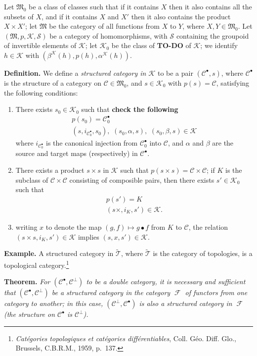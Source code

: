 \documentclass{article}
\newenvironment{itenv}[1]
  {\phantomsection\par\medskip\noindent\textbf{#1.}\itshape}
  {\par\medskip}
\newenvironment{rmenv}[1]
  {\phantomsection\par\medskip\noindent\textbf{#1.}\rmfamily}
  {\par\medskip}
\newcommand{\oldpage}[1]{\marginpar{\footnotesize$\Big\vert$ \textit{p.~#1}}}
\newcommand{\todo}{{\color{purple}\textbf{TO-DO }}}
\newcommand{\unsure}[1]{{\color{purple}\textbf{#1}}}
\newcommand{\CC}{\mathcal{C}}
\newcommand{\dotc}{{\mathbin{\bullet}}}
\newcommand{\botc}{{\mathbin{\bot}}}
\DeclareMathOperator{\FF}{\mathcal{F}}
\newcommand{\MM}{\mathfrak{M}}
\newcommand{\KK}{\mathcal{K}}
\renewcommand{\SS}{\mathcal{S}}
\newcommand{\TT}{\mathcal{T}}
\begin{document}
Let $\MM_0$ be a class of classes such that if it contains $X$ then it also contains all the subsets of $X$, and if it contains $X$ and $X'$ then it also contains the product $X\times X'$;
let $\MM$ be the category of all functions from $X$ to $Y$, where $X,Y\in\MM_0$.
Let $(\MM,p,\KK,\SS)$ be a category of homomorphisms, with $\SS$ containing the groupoid of invertible elements of $\KK$;
let $\KK_0$ be the class of \todo of $\KK$;
we identify $h\in\KK$ with $(\beta^\KK(h),p(h),\alpha^\KK(h))$.

\begin{rmenv}{Definition}
  We define a \emph{structured category in $\KK$} to be a pair $(\CC^\dotc,s)$, where $\CC^\dotc$ is the structure of a category on $\CC\in\MM_0$, and $s\in\KK_0$ with $p(s)=\CC$, satisfying the following conditions:
  \begin{enumerate}
    \item There exists $s_0\in\KK_0$ such that \unsure{check the following}
      \[
        \begin{gathered}
          p(s_0)
          = \CC_0^\dotc
        \\(s,i_{\CC_0^\dotc},s_0),\,\,
          (s_0,\alpha,s),\,\,
          (s_0,\beta,s)
          \in\KK
        \end{gathered}
      \]
      where $i_{\CC_0^\dotc}$ is the canonical injection from $\CC_0^\dotc$ into $\CC$, and $\alpha$ and $\beta$ are the source and target maps (respectively) in $\CC^\dotc$.
    \item There exists a product $s\times s$ in $\KK$ such that $p(s\times s)=\CC\times\CC$;
      if $K$ is the subclass of $\CC\times\CC$ consisting of composible pairs, then there exists $s'\in\KK_0$ such that
      \[
        \begin{gathered}
          p(s')=K
        \\(s\times ,i_K,s')\in\KK.
        \end{gathered}
      \]
    \item writing $x$ to denote the map $(g,f)\mapsto g\dotc f$ from $K$ to $\CC$, the relation $(s\times s,i_K,s')\in\KK$ implies $(s,x,s')\in\KK$.
  \end{enumerate}
\end{rmenv}

\begin{rmenv}{Example}
  A structured category in $\tilde{\TT}$, where $\tilde{\TT}$ is the category of topologies, is a topological category.\footnote{\emph{Catégories topologiques et catégories différentiables}, Coll. Géo. Diff. Glo., Brussels, C.B.R.M., 1959, p.~137.}
\end{rmenv}

\oldpage{4}

\begin{itenv}{Theorem}
  For $(\CC^\dotc,\CC^\botc)$ to be a double category, it is necessary and sufficient that $(\CC^\dotc,\CC^\botc)$ be a structured category in the category $\FF$ of functors from one category to another;
  in this case, $(\CC^\botc,\CC^\dotc)$ is also a structured category in $\FF$ (the structure on $\CC^\dotc$ is $\CC^\botc$).
\end{itenv}
\end{document}
